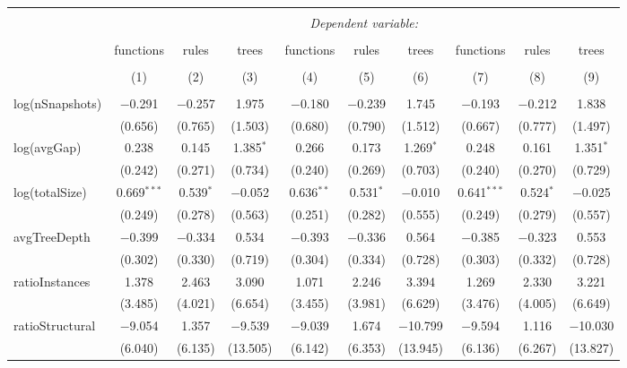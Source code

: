 \documentclass{report}
\begin{document}
\begin{table}[!htbp] \centering 
  \caption{} 
  \label{} 
\begin{tabular}{@{\extracolsep{5pt}}lccccccccc} 
\\[-1.8ex]\hline 
\hline \\[-1.8ex] 
 & \multicolumn{9}{c}{\textit{Dependent variable:}} \\ 
\cline{2-10} 
\\[-1.8ex] & functions & rules & trees & functions & rules & trees & functions & rules & trees \\ 
\\[-1.8ex] & (1) & (2) & (3) & (4) & (5) & (6) & (7) & (8) & (9)\\ 
\hline \\[-1.8ex] 
 log(nSnapshots) & $-$0.291 & $-$0.257 & 1.975 & $-$0.180 & $-$0.239 & 1.745 & $-$0.193 & $-$0.212 & 1.838 \\ 
  & (0.656) & (0.765) & (1.503) & (0.680) & (0.790) & (1.512) & (0.667) & (0.777) & (1.497) \\ 
  log(avgGap) & 0.238 & 0.145 & 1.385$^{*}$ & 0.266 & 0.173 & 1.269$^{*}$ & 0.248 & 0.161 & 1.351$^{*}$ \\ 
  & (0.242) & (0.271) & (0.734) & (0.240) & (0.269) & (0.703) & (0.240) & (0.270) & (0.729) \\ 
  log(totalSize) & 0.669$^{***}$ & 0.539$^{*}$ & $-$0.052 & 0.636$^{**}$ & 0.531$^{*}$ & $-$0.010 & 0.641$^{***}$ & 0.524$^{*}$ & $-$0.025 \\ 
  & (0.249) & (0.278) & (0.563) & (0.251) & (0.282) & (0.555) & (0.249) & (0.279) & (0.557) \\ 
  avgTreeDepth & $-$0.399 & $-$0.334 & 0.534 & $-$0.393 & $-$0.336 & 0.564 & $-$0.385 & $-$0.323 & 0.553 \\ 
  & (0.302) & (0.330) & (0.719) & (0.304) & (0.334) & (0.728) & (0.303) & (0.332) & (0.728) \\ 
  ratioInstances & 1.378 & 2.463 & 3.090 & 1.071 & 2.246 & 3.394 & 1.269 & 2.330 & 3.221 \\ 
  & (3.485) & (4.021) & (6.654) & (3.455) & (3.981) & (6.629) & (3.476) & (4.005) & (6.649) \\ 
  ratioStructural & $-$9.054 & 1.357 & $-$9.539 & $-$9.039 & 1.674 & $-$10.799 & $-$9.594 & 1.116 & $-$10.030 \\ 
  & (6.040) & (6.135) & (13.505) & (6.142) & (6.353) & (13.945) & (6.136) & (6.267) & (13.827) \\ 

\end{tabular}
\end{table}
\end{document}
